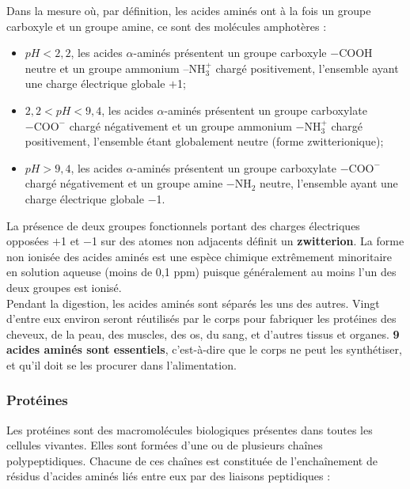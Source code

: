 \documentclass[11pt,a4paper]{report}
\begin{document}
Dans la mesure où, par définition, les acides aminés ont à la fois un groupe carboxyle et un groupe amine, ce sont des molécules amphotères :
\begin{itemize}
	\item $pH < 2,2$, les acides $\alpha$-aminés présentent un groupe carboxyle $-\text{COOH}$ neutre et un groupe ammonium $–\text{NH}_3^+$ chargé positivement, l'ensemble ayant une charge électrique globale $+$1;
	\item $2,2 < pH < 9,4$, les acides $\alpha$-aminés présentent un groupe carboxylate $-\text{COO}^-$ chargé négativement et un groupe ammonium $-\text{NH}_3^+$ chargé positivement, l'ensemble étant globalement neutre (forme zwitterionique);
	\item $pH > 9,4$, les acides $\alpha$-aminés présentent un groupe carboxylate $-\text{COO}^-$ chargé négativement et un groupe amine $-\text{NH}_2$ neutre, l'ensemble ayant une charge électrique globale $-$1.
\end{itemize}

La présence de deux groupes fonctionnels portant des charges électriques opposées $+$1 et $-$1 sur des atomes non adjacents définit un \textbf{zwitterion}. La forme non ionisée des acides aminés est une espèce chimique extrêmement minoritaire en solution aqueuse (moins de 0,1 ppm) puisque généralement au moins l'un des deux groupes est ionisé.\\ 

Pendant la digestion, les acides aminés sont séparés les uns des autres. Vingt d'entre eux environ seront réutilisés par le corps pour fabriquer les protéines des cheveux, de la peau, des muscles, des os, du sang, et d'autres tissus et organes. \textbf{9 acides aminés sont essentiels}, c'est-à-dire que le corps ne peut les synthétiser, et qu'il doit se les procurer dans l'alimentation.

\newpage
\subsubsection*{Protéines}

Les protéines sont des macromolécules biologiques présentes dans toutes les cellules vivantes. Elles sont formées d'une ou de plusieurs chaînes polypeptidiques. Chacune de ces chaînes est constituée de l'enchaînement de résidus d'acides aminés liés entre eux par des liaisons peptidiques :
\end{document}
